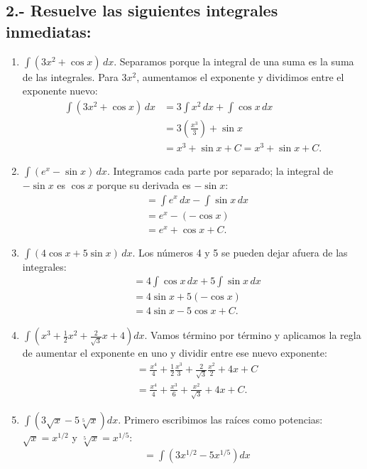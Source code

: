 \documentclass[12pt, letterpaper]{article}
\makeatletter
\renewcommand{\alph}[1]{\expandafter\@alphlatin\csname c@#1\endcsname}
\newcommand{\@alphlatin}[1]{\ifcase#1\or a\or b\or c\or d\or e\or f\or g\or h\or i\or j\or k\or l\or m\or n\or o\or p\or q\or r\or s\or t\or u\or v\or w\or x\or y\or z\else\@ctrerr\fi}
\makeatother
\begin{document}
\subsection*{2.- Resuelve las siguientes integrales inmediatas:}
\begin{enumerate}[label=\alph*)]
  \item $\displaystyle\int(3x^2+\cos x)\,dx$. Separamos porque la integral de una suma es la suma de las integrales. Para $3x^2$, aumentamos el exponente y dividimos entre el exponente nuevo:
  \[
  \begin{aligned}
  \int(3x^2+\cos x)\,dx&=3\int x^2\,dx+\int\cos x\,dx\\
  &=3\left(\frac{x^3}{3}\right)+\sin x\\
  &=x^3+\sin x+C=\boxed{x^3+\sin x+C}.
  \end{aligned}
  \]
  \item $\displaystyle\int(e^x-\sin x)\,dx$. Integramos cada parte por separado; la integral de $-\sin x$ es $\cos x$ porque su derivada es $-\sin x$:
  \[
  \begin{aligned}
  &=\int e^x\,dx-\int\sin x\,dx\\
  &=e^x-(-\cos x)\\
  &=\boxed{e^x+\cos x+C}.
  \end{aligned}
  \]
  \item $\displaystyle\int(4\cos x+5\sin x)\,dx$. Los números 4 y 5 se pueden dejar afuera de las integrales:
  \[
  \begin{aligned}
  &=4\int\cos x\,dx+5\int\sin x\,dx\\
  &=4\sin x+5(-\cos x)\\
  &=\boxed{4\sin x-5\cos x+C}.
  \end{aligned}
  \]
  \item $\displaystyle\int\left(x^3+\frac12x^2+\frac{2}{\sqrt3}x+4\right)dx$. Vamos término por término y aplicamos la regla de aumentar el exponente en uno y dividir entre ese nuevo exponente:
  \[
  \begin{aligned}
  &=\frac{x^4}{4}+\frac12\frac{x^3}{3}+\frac{2}{\sqrt3}\frac{x^2}{2}+4x+C\\
  &=\boxed{\frac{x^4}{4}+\frac{x^3}{6}+\frac{x^2}{\sqrt3}+4x+C}.
  \end{aligned}
  \]
  \item $\displaystyle\int\left(3\sqrt{x}-5\sqrt[5]{x}\right)dx$. Primero escribimos las raíces como potencias: $\sqrt{x}=x^{1/2}$ y $\sqrt[5]{x}=x^{1/5}$:
  \[
  \begin{aligned}
  &=\int(3x^{1/2}-5x^{1/5})dx\\

\end{aligned}\]
\end{enumerate}
\end{document}
